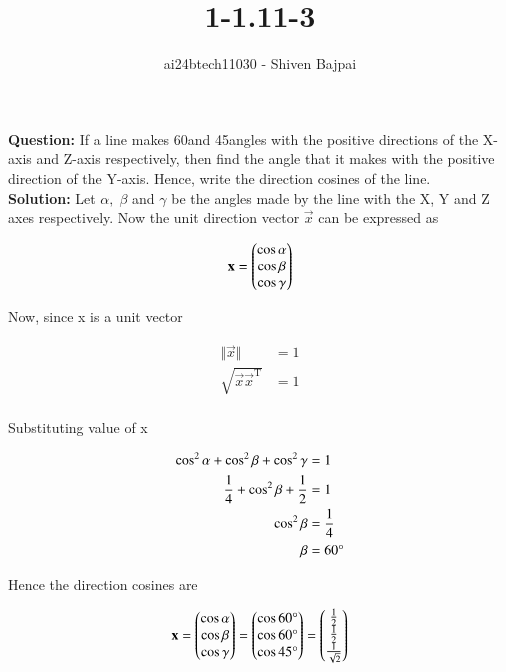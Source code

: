 \documentclass[journal]{IEEEtran}
\begin{document}
\onecolumn

\vspace{3cm}

\renewcommand{\thefigure}{\theenumi}
\renewcommand{\thetable}{\theenumi}

\title{1-1.11-3}
\author{ai24btech11030 - Shiven Bajpai}
\maketitle

\renewcommand{\thefigure}{\theenumi}
\renewcommand{\thetable}{\theenumi}

\textbf{Question: } If a line makes 60\degree  and 45\degree  angles with the positive directions of the X-axis and Z-axis respectively, then find the angle that it makes with the positive direction of the Y-axis. Hence, write the direction cosines of the line. 
\\

\textbf{Solution: } Let $\alpha,\; \beta$ and $\gamma$ be the angles made by the line with the X, Y and Z axes respectively. Now the unit direction vector $\vec{x}$ can be expressed as

\begin{align*}
	\mathbf{x} &= \begin{pmatrix}\cos\alpha\\\cos\beta\\\cos\gamma\end{pmatrix}\\
\end{align*}

Now, since x is a unit vector

\begin{align*}
	\Vert\vec{x}\Vert &= 1\\
	\sqrt{\vec{x}\vec{x}^\text{T}} &= 1\\
\end{align*}

Substituting value of x

\begin{align*}
	\cos^2\alpha + \cos^2\beta + \cos^2\gamma &= 1\\
	\frac{1}{4} + \cos^2\beta + \frac{1}{2} &= 1\\
	\cos^2\beta &= \frac{1}{4}\\
	\beta &= 60\degree\\
\end{align*}

Hence the direction cosines are

$$\mathbf{x} = \begin{pmatrix}\cos\alpha\\\cos\beta\\\cos\gamma\end{pmatrix} = \begin{pmatrix}\cos60\degree\\\cos60\degree\\\cos45\degree\end{pmatrix} = \begin{pmatrix}\frac{1}{2}\\\frac{1}{2}\\\frac{1}{\sqrt{2}}\end{pmatrix}$$
\end{document}
